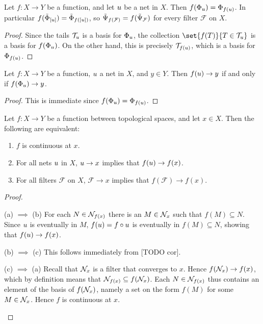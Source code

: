 \documentclass[article, a4paper, 11pt, oneside]{memoir}
\numberwithin{equation}{chapter}
\newcommand{\calF}{\mathcal{F}}
\theoremstyle{nonumberplain}
\begin{document}
\begin{lemma}
    Let $f \colon X \to Y$ be a function, and let $\mynet$ be a net in $X$. Then $f(\evfilt[\mynet]) = \evfilt[f(\mynet)]$. In particular $f(\evfilteq[{[u]}]) = \evfilteq[f({[u]})]$, so $\myinv[f(\calF)] = f(\myinv[\calF])$ for every filter $\calF$ on $X$.
\end{lemma}

\begin{proof}
    Since the tails $\tails{\mynet}$ is a basis for $\evfilt[\mynet]$, the collection $\set{f(T)}{T \in \tails{\mynet}}$ is a basis for $f(\evfilt[\mynet])$. On the other hand, this is precisely $\tails{f(\mynet)}$, which is a basis for $\evfilt[f(\mynet)]$.
\end{proof}


\begin{corollary}
    Let $f \colon X \to Y$ be a function, $\mynet$ a net in $X$, and $y \in Y$. Then $f(\mynet) \to y$ if and only if $f(\evfilt[\mynet]) \to y$.
\end{corollary}

\begin{proof}
    This is immediate since $f(\evfilt[\mynet]) = \evfilt[f(\mynet)]$.
\end{proof}


\begin{proposition}
    Let $f \colon X \to Y$ be a function between topological spaces, and let $x \in X$. Then the following are equivalent:
    \begin{enumerate}
        \item $f$ is continuous at $x$.
        \item For all nets $\mynet$ in $X$, $\mynet \to x$ implies that $f(\mynet) \to f(x)$.
        \item For all filters $\calF$ on $X$, $\calF \to x$ implies that $f(\calF) \to f(x)$.
    \end{enumerate}
\end{proposition}

\begin{proof}
\begin{proofsec}
    \item[(a) $\implies$ (b)]
    For each $N \in \nhoods{f(x)}$ there is an $M \in \nhoods{x}$ such that $f(M) \subseteq N$. Since $\mynet$ is eventually in $M$, $f(\mynet) = f \circ \mynet$ is eventually in $f(M) \subseteq N$, showing that $f(\mynet) \to f(x)$. %

    \item[(b) $\implies$ (c)]
    This follows immediately from [TODO cor].

    \item[(c) $\implies$ (a)]
    Recall that $\nhoods{x}$ is a filter that converges to $x$. Hence $f(\nhoods{x}) \to f(x)$, which by definition means that $\nhoods{f(x)} \subseteq f(\nhoods{x})$. Each $N \in \nhoods{f(x)}$ thus contains an element of the basis of $f(\nhoods{x})$, namely a set on the form $f(M)$ for some $M \in \nhoods{x}$. Hence $f$ is continuous at $x$.
\end{proofsec}
\end{proof}
\end{document}
